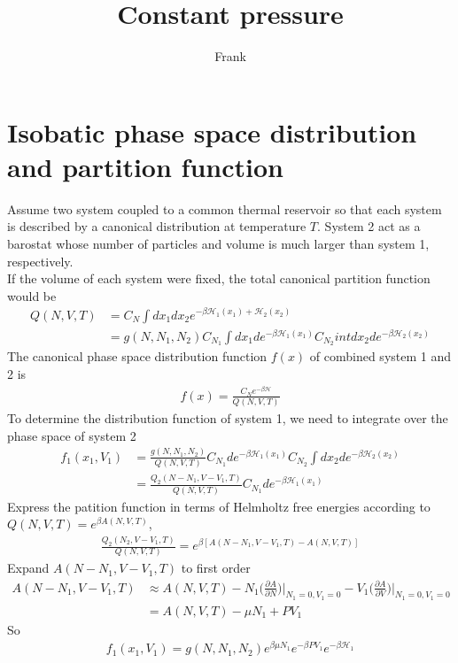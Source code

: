 \documentclass{article}
\title{Constant pressure}
\author{Frank}
\begin{document}
\maketitle
\section{Isobatic phase space distribution and partition function}
Assume two system coupled to a common thermal reservoir so that each system is described by a canonical distribution at temperature $T$. System 2 act as a barostat whose number of particles and volume is much larger than system 1, respectively.\\
If the volume of each system were fixed, the total canonical partition function would be
\begin{align}
Q(N,V,T)&=C_N\int dx_1dx_2e^{-\beta\mathscr{H}_1(x_1)+\mathscr{H}_2(x_2)}\nonumber\\
&=g(N,N_1,N_2)C_{N_1}\int dx_1de^{-\beta\mathscr{H}_1(x_1)}C_{N_2}int dx_2de^{-\beta\mathscr{H}_2(x_2)}
\end{align}
The canonical phase space distribution function $f(x)$  of combined system 1 and 2 is
\begin{align}
f(x)=\frac{C_Ne^{-\beta\mathscr{H}}}{Q(N,V,T)}
\end{align}
To determine the distribution function of system 1, we need to integrate over the phase space of system 2
\begin{align}
f_1(x_1,V_1)&=\frac{g(N,N_1,N_2)}{Q(N,V,T)}C_{N_1}de^{-\beta\mathscr{H}_1(x_1)}C_{N_2}\int dx_2de^{-\beta\mathscr{H}_2(x_2)}\nonumber\\
&=\frac{Q_2(N-N_1,V-V_1,T)}{Q(N,V,T)}C_{N_1}de^{-\beta\mathscr{H}_1(x_1)}
\end{align}
Express the patition function in terms of Helmholtz free energies according to $Q(N,V,T)=e^{\beta A(N,V,T)}$,
\begin{align}
\frac{Q_2(N_2,V-V_1,T)}{Q(N,V,T)}=e^{\beta [A(N-N_1,V-V_1,T)-A(N,V,T)]}
\end{align}
Expand $A(N-N_1,V-V_1,T)$ to first order
\begin{align}
A(N-N_1,V-V_1,T)&\approx A(N,V,T)-N_1\Big(\frac{\partial A}{\partial N}\Big)\Big|_{N_1=0,V_1=0}-V_1\Big(\frac{\partial A}{\partial V}\Big)\Big|_{N_1=0,V_1=0}\nonumber\\
&=A(N,V,T)-\mu N_1+PV_1
\end{align}
So
\begin{align}
f_1(x_1,V_1)=g(N,N_1,N_2)e^{\beta\mu N_1}e^{-\beta PV_1}e^{-\beta\mathscr{H}_1}
\end{align}
\end{document}
